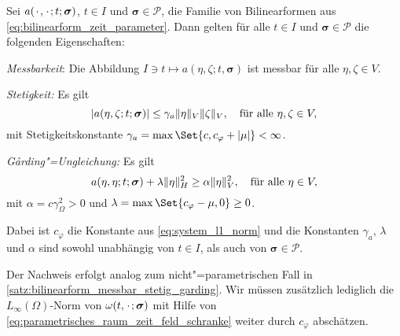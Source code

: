 \documentclass[../main.tex]{subfiles}
\begin{document}
\begin{Satz}
\label{satz:parametrische_bilinearform_messbar_stetig_garding}
    Sei $a({\mkern2mu\cdot\mkern2mu}, {\mkern2mu\cdot\mkern2mu}; t; \bm\sigma)$, $t \in I$ und $\bm\sigma \in \mathcal P$, die Familie von Bilinearformen aus \cref{eq:bilinearform_zeit_parameter}.
    Dann gelten für alle $t \in I$ und $\bm\sigma \in \mathcal P$ die folgenden Eigenschaften:
    \begin{thmenumerate}
        \item\label{satz:parametrische_bilinearform_messbar_stetig_garding:messbar}
        \emph{Messbarkeit}: Die Abbildung $I \ni t \mapsto a(\eta, \zeta; t, \bm\sigma)$ ist messbar für alle $\eta, \zeta \in V$.
        \item\label{satz:parametrische_bilinearform_messbar_stetig_garding:stetig}
        \emph{Stetigkeit:} Es gilt
        \begin{equation}
            \label{eq:parametrische_bilinearform_messbar_stetig_garding:stetig}
            \abs{a(\eta, \zeta; t; \bm\sigma)} \leq \gamma_{a} \norm{\eta}_{V} \norm{\zeta}_{V}, \quad \fa \eta, \zeta \in V,
        \end{equation}
        mit Stetigkeitskonstante $\gamma_{a} = \max\Set{c, c_{\varphi} + \abs{\mu}} < \infty$.
        \item\label{satz:parametrische_bilinearform_messbar_stetig_garding:garding}
        \emph{G\aa{}rding"=Ungleichung:} Es gilt
        \begin{equation}
            \label{eq:parametrische_bilinearform_messbar_stetig_garding:garding}
            a(\eta, \eta; t; \bm\sigma) + \lambda \norm{\eta}_{H}^{2} \geq \alpha \norm{\eta}_{V}^{2}, \quad \fa \eta \in V,
        \end{equation}
        mit $\alpha = c \gamma_{\Omega}^{2} > 0$ und $\lambda = \max\Set{c_{\varphi} - \mu, 0} \geq 0$.
    \end{thmenumerate}
    Dabei ist $c_{\varphi}$ die Konstante aus \cref{eq:system_l1_norm} und die Konstanten $\gamma_{a}$, $\lambda$ und $\alpha$ sind sowohl unabhängig von $t \in I$, als auch von $\bm\sigma \in \mathcal P$.

    \begin{Beweis}
        Der Nachweis erfolgt analog zum nicht"=parametrischen Fall in \cref{satz:bilinearform_messbar_stetig_garding}.
        Wir müssen zusätzlich lediglich die $L_{\infty}(\Omega)$-Norm von $\omega(t, {\mkern2mu\cdot\mkern2mu}; \bm\sigma)$ mit Hilfe von \cref{eq:parametrisches_raum_zeit_feld_schranke} weiter durch $c_{\varphi}$ abschätzen.
    \end{Beweis}
\end{Satz}
\end{document}
